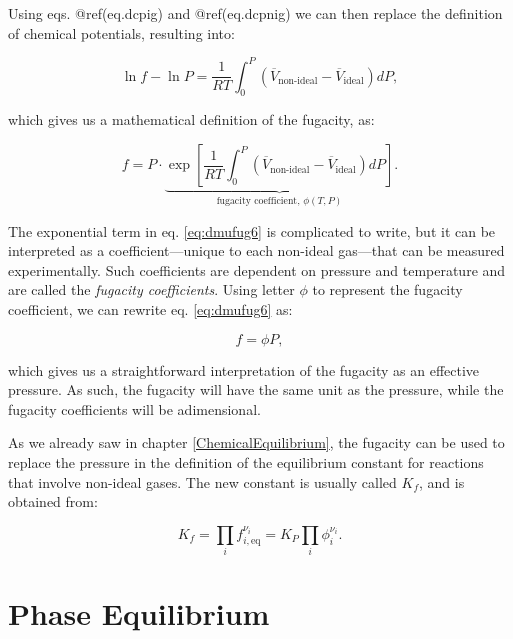 \documentclass[
  9pt,
]{extbook}
\theoremstyle{definition}
\theoremstyle{definition}
\theoremstyle{definition}
\theoremstyle{remark}
\begin{document}
Using eqs. @ref(eq.dcpig) and @ref(eq.dcpnig) we can then replace the definition of chemical potentials, resulting into:

\begin{equation}
\ln f - \ln P = \frac{1}{RT} \int_0^P \left(\overline{V}_{\text{non-ideal}} - \overline{V}_{\text{ideal}} \right) dP,
\label{eq:dmufug5}
\end{equation}

which gives us a mathematical definition of the fugacity, as:

\begin{equation}
f = P \cdot \underbrace{\exp\left[ \frac{1}{RT} \int_0^P \left(\overline{V}_{\text{non-ideal}}-\overline{V}_{\text{ideal}} \right) dP \right]}_{\text{fugacity coefficient, }\phi(T,P)}.
\label{eq:dmufug6}
\end{equation}

The exponential term in eq. \eqref{eq:dmufug6} is complicated to write, but it can be interpreted as a coefficient---unique to each non-ideal gas---that can be measured experimentally. Such coefficients are dependent on pressure and temperature and are called the \emph{fugacity coefficients}. Using letter \(\phi\) to represent the fugacity coefficient, we can rewrite eq. \eqref{eq:dmufug6} as:

\begin{equation}
f = \phi P,
\label{eq:dmufug7}
\end{equation}

which gives us a straightforward interpretation of the fugacity as an effective pressure. As such, the fugacity will have the same unit as the pressure, while the fugacity coefficients will be adimensional.

As we already saw in chapter \ref{ChemicalEquilibrium}, the fugacity can be used to replace the pressure in the definition of the equilibrium constant for reactions that involve non-ideal gases. The new constant is usually called \(K_f\), and is obtained from:

\begin{equation}
K_f=\prod_i f_{i,\text{eq}}^{\nu_i} = K_P \prod_i \phi_{i}^{\nu_i}.
\label{eq:kfdef}
\end{equation}

\renewcommand*{\standardstate}{{-\kern-6pt{\ominus}\kern-6pt-}}

\hypertarget{PhaseEquilibrium}{%
\chapter{Phase Equilibrium}\label{PhaseEquilibrium}}
\end{document}
